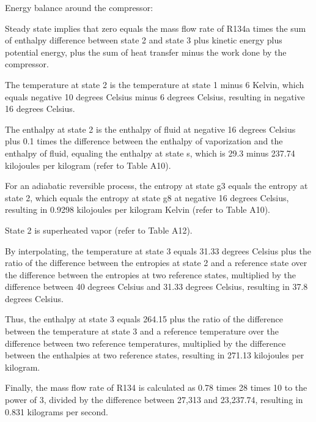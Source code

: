 Energy balance around the compressor:

Steady state implies that zero equals the mass flow rate of R134a times the sum of enthalpy difference between state 2 and state 3 plus kinetic energy plus potential energy, plus the sum of heat transfer minus the work done by the compressor.

The temperature at state 2 is the temperature at state 1 minus 6 Kelvin, which equals negative 10 degrees Celsius minus 6 degrees Celsius, resulting in negative 16 degrees Celsius.

The enthalpy at state 2 is the enthalpy of fluid at negative 16 degrees Celsius plus 0.1 times the difference between the enthalpy of vaporization and the enthalpy of fluid, equaling the enthalpy at state s, which is 29.3 minus 237.74 kilojoules per kilogram (refer to Table A10).

For an adiabatic reversible process, the entropy at state g3 equals the entropy at state 2, which equals the entropy at state g8 at negative 16 degrees Celsius, resulting in 0.9298 kilojoules per kilogram Kelvin (refer to Table A10).

State 2 is superheated vapor (refer to Table A12).

By interpolating, the temperature at state 3 equals 31.33 degrees Celsius plus the ratio of the difference between the entropies at state 2 and a reference state over the difference between the entropies at two reference states, multiplied by the difference between 40 degrees Celsius and 31.33 degrees Celsius, resulting in 37.8 degrees Celsius.

Thus, the enthalpy at state 3 equals 264.15 plus the ratio of the difference between the temperature at state 3 and a reference temperature over the difference between two reference temperatures, multiplied by the difference between the enthalpies at two reference states, resulting in 271.13 kilojoules per kilogram.

Finally, the mass flow rate of R134 is calculated as 0.78 times 28 times 10 to the power of 3, divided by the difference between 27,313 and 23,237.74, resulting in 0.831 kilograms per second.